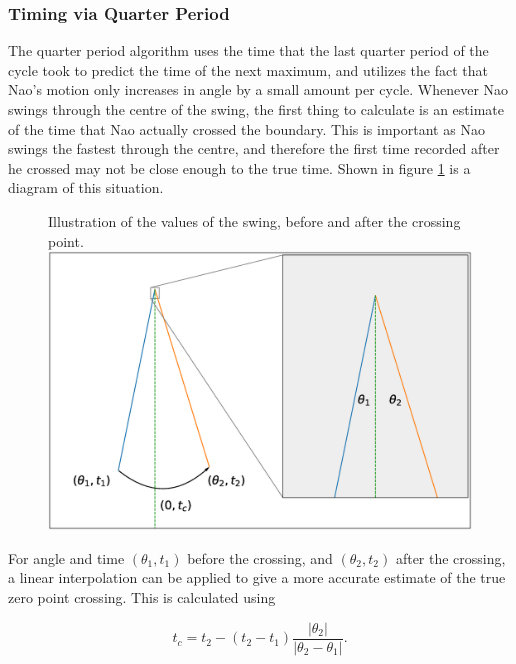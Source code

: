 \documentclass[11pt]{article}
\newcommand*\ruleline[1]{\par\noindent\raisebox{.8ex}{\makebox[\linewidth]{\hrulefill\hspace{1ex}\raisebox{-.8ex}{#1}\hspace{1ex}\hrulefill}}}
\begin{document}
\subsubsection{Timing via Quarter Period}
\ruleline{George Sheppard}
The quarter period algorithm uses the time that the last quarter period of the cycle took to predict the time of the next maximum, and utilizes the fact that Nao's motion only increases in angle by a small amount per cycle. Whenever Nao swings through the centre of the swing, the first thing to calculate is an estimate of the time that Nao actually crossed the boundary. This is important as Nao swings the fastest through the centre, and therefore the first time recorded after he crossed may not be close enough to the true time. Shown in figure \ref{fig:InterpolationDiagram} is a diagram of this situation. 

    \begin{figure}[!htb]
        \centering
        \captionbox
             {Illustration of the values of the swing, before and after the crossing point.\label{fig:InterpolationDiagram}}
             {\includegraphics[width=1.0\textwidth]{InterpolationDiagram.eps}}
    \end{figure}

For angle and time $(\theta_1, t_1)$ before the crossing, and $(\theta_2, t_2)$ after the crossing, a linear interpolation can be applied to give a more accurate estimate of the true zero point crossing. This is calculated using

\begin{equation}
    t_c = t_2 - (t_2 - t_1) \frac{|\theta_2|}{|\theta_2 - \theta_1|}.
\end{equation}
\end{document}
